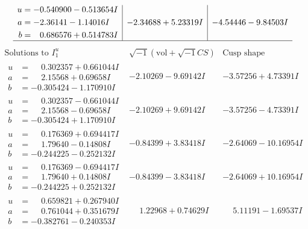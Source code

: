 \documentclass[1p]{elsarticle_modified}
\theoremstyle{definition}
\newcommand{\I}{\sqrt{-1}}
\begin{document}
$$\begin{array}{c|c|c}
\begin{aligned}
u &= -0.540900 - 0.513654 I \\
a &= -2.36141 - 1.14016 I \\
b &= \phantom{-}0.686576 + 0.514783 I\end{aligned}
 & -2.34688 + 5.23319 I & -4.54446 - 9.84503 I\\
 \hline 
 \end{array}$$\newpage$$\begin{array}{c|c|c}  
\text{Solutions to }I^u_{1}& \I (\text{vol} + \sqrt{-1}CS) & \text{Cusp shape}\\
 \hline 
\begin{aligned}
u &= \phantom{-}0.302357 + 0.661044 I \\
a &= \phantom{-}2.15568 + 0.69658 I \\
b &= -0.305424 - 1.170910 I\end{aligned}
 & -2.10269 - 9.69142 I & -3.57256 + 4.73391 I \\ \hline\begin{aligned}
u &= \phantom{-}0.302357 - 0.661044 I \\
a &= \phantom{-}2.15568 - 0.69658 I \\
b &= -0.305424 + 1.170910 I\end{aligned}
 & -2.10269 + 9.69142 I & -3.57256 - 4.73391 I \\ \hline\begin{aligned}
u &= \phantom{-}0.176369 + 0.694417 I \\
a &= \phantom{-}1.79640 - 0.14808 I \\
b &= -0.244225 - 0.252132 I\end{aligned}
 & -0.84399 + 3.83418 I & -2.64069 - 10.16954 I \\ \hline\begin{aligned}
u &= \phantom{-}0.176369 - 0.694417 I \\
a &= \phantom{-}1.79640 + 0.14808 I \\
b &= -0.244225 + 0.252132 I\end{aligned}
 & -0.84399 - 3.83418 I & -2.64069 + 10.16954 I \\ \hline\begin{aligned}
u &= \phantom{-}0.659821 + 0.267940 I \\
a &= \phantom{-}0.761044 + 0.351679 I \\
b &= -0.382761 - 0.240353 I\end{aligned}
 & \phantom{-}1.22968 + 0.74629 I & \phantom{-}5.11191 - 1.69537 I \\ \hline\begin{aligned}

\end{aligned}
\end{array}$$
\end{document}
